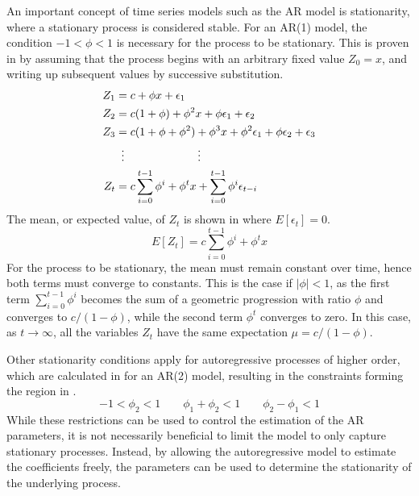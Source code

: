     An important concept of time series models such as the AR model is stationarity, where a stationary process is considered stable. For an AR(1) model, the condition $-1<\phi<1$ is necessary for the process to be stationary. This is proven in \cite{alonso2012autoregressive} by assuming that the process begins with an arbitrary fixed value $Z_0=x$, and writing up subsequent values by successive substitution.
    \begin{equation}
        \begin{split}
            Z_1 & = c + \phi x + \epsilon_1 \\
            Z_2 & = c(1+\phi) + \phi^2x+\phi\epsilon_1 + \epsilon_2 \\
            Z_3 & = c(1+\phi+\phi^2) + \phi^3x + \phi^2\epsilon_1 + \phi\epsilon_2 + \epsilon_3 \\
            & \vdotswithin{=}\qquad\qquad\qquad \vdots \\
            Z_t & = c\sum_{i=0}^{t-1}\phi^i + \phi^tx + \sum_{i=0}^{t-1}\phi^i\epsilon_{t-i}
        \end{split}
    \end{equation}
    The mean, or expected value, of $Z_t$ is shown in  where $E[\epsilon_t]=0$.
    \begin{equation}\label{eq:ar-expectation}
        E[Z_t] = c\sum_{i=0}^{t-1}\phi^i+\phi^tx
    \end{equation}
    For the process to be stationary, the mean must remain constant over time, hence both terms must converge to constants. This is the case if $|\phi|<1$, as the first term $\sum_{i=0}^{t-1}\phi^i$ becomes the sum of a geometric progression with ratio $\phi$ and converges to $c/(1-\phi)$, while the second term $\phi^t$ converges to zero. In this case, as $t\rightarrow\infty$, all the variables $Z_t$ have the same expectation $\mu=c/(1-\phi)$.
    
    Other stationarity conditions apply for autoregressive processes of higher order, which are calculated in \cite{giles2012stationarity} for an AR(2) model, resulting in the constraints forming the region in .
    \begin{equation}\label{eq:ar-2-constraints}
        -1<\phi_2<1 \qquad \phi_1+\phi_2<1 \qquad \phi_2-\phi_1<1
    \end{equation}
    While these restrictions can be used to control the estimation of the AR parameters, it is not necessarily beneficial to limit the model to only capture stationary processes. Instead, by allowing the autoregressive model to estimate the coefficients freely, the parameters can be used to determine the stationarity of the underlying process.
    
    

